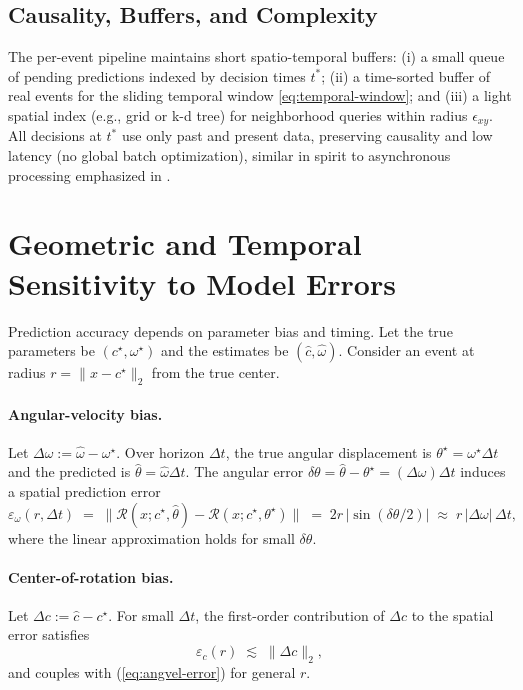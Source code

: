 \subsection{Causality, Buffers, and Complexity}
The per-event pipeline maintains short spatio-temporal buffers: (i) a small queue of pending predictions indexed by decision times $t^*$; (ii) a time-sorted buffer of real events for the sliding temporal window \eqref{eq:temporal-window}; and (iii) a light spatial index (e.g., grid or k-d tree) for neighborhood queries within radius $\epsilon_{xy}$. All decisions at $t^*$ use only past and present data, preserving causality and low latency (no global batch optimization), similar in spirit to asynchronous processing emphasized in \cite{Wang2025Thesis,Scheerlinck2021Thesis}.

\section{Geometric and Temporal Sensitivity to Model Errors}
Prediction accuracy depends on parameter bias and timing. Let the true parameters be $(c^\star,\omega^\star)$ and the estimates be $(\hat c,\hat\omega)$. Consider an event at radius $r=\|x-c^\star\|_2$ from the true center.

\paragraph{Angular-velocity bias.}
Let $\Delta\omega := \hat\omega-\omega^\star$. Over horizon $\Delta t$, the true angular displacement is $\theta^\star=\omega^\star \Delta t$ and the predicted is $\hat\theta=\hat\omega \Delta t$. The angular error $\delta\theta=\hat\theta-\theta^\star=(\Delta\omega)\Delta t$ induces a spatial prediction error
\begin{equation}
\varepsilon_{\omega}(r,\Delta t) \;=\; \big\|\mathcal{R}(x;c^\star,\hat\theta)-\mathcal{R}(x;c^\star,\theta^\star)\big\|
\;=\; 2r\,\big|\sin(\delta\theta/2)\big|
\;\approx\; r\,|\Delta\omega|\,\Delta t,
\label{eq:angvel-error}
\end{equation}
where the linear approximation holds for small $\delta\theta$.

\paragraph{Center-of-rotation bias.}
Let $\Delta c := \hat c - c^\star$. For small $\Delta t$, the first-order contribution of $\Delta c$ to the spatial error satisfies
\begin{equation}
\varepsilon_{c}(r) \;\lesssim\; \|\Delta c\|_2,
\label{eq:center-error}
\end{equation}
and couples with (\ref{eq:angvel-error}) for general $r$.

